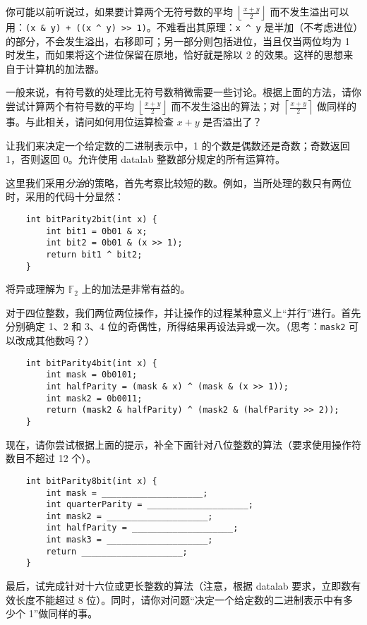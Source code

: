     \begin{example}[模拟操作]
        你可能以前听说过，如果要计算两个无符号数的平均 $\left \lfloor \frac{x+y}{2} \right \rfloor$ 而不发生溢出可以用：\verb|(x & y) + ((x ^ y) >> 1)|。不难看出其原理：\verb|x ^ y| 是半加（不考虑进位）的部分，不会发生溢出，右移即可；另一部分则包括进位，当且仅当两位均为 1 时发生，而如果将这个进位保留在原地，恰好就是除以 2 的效果。这样的思想来自于计算机的加法器。

        一般来说，有符号数的处理比无符号数稍微需要一些讨论。根据上面的方法，请你尝试计算两个有符号数的平均 $\left \lfloor \frac{x+y}{2} \right \rfloor$ 而不发生溢出的算法；对 $\left \lceil \frac{x+y}{2} \right \rceil$ 做同样的事。与此相关，请问如何用位运算检查 $x+y$ 是否溢出了？
    \end{example}

    \begin{example}[计数]
        让我们来决定一个给定数的二进制表示中，1 的个数是偶数还是奇数；奇数返回 1，否则返回 0。允许使用 datalab 整数部分规定的所有运算符。
        
        这里我们采用\emph{分治}的策略，首先考察比较短的数。例如，当所处理的数只有两位时，采用的代码十分显然：
        \begin{verbatim}
    int bitParity2bit(int x) {
        int bit1 = 0b01 & x;
        int bit2 = 0b01 & (x >> 1);
        return bit1 ^ bit2;
    }
        \end{verbatim}
        将异或理解为 $\mathbb F_2$ 上的加法是非常有益的。

        对于四位整数，我们两位两位操作，并让操作的过程某种意义上“并行”进行。首先分别确定 1、2 和 3、4 位的奇偶性，所得结果再设法异或一次。（思考：\texttt{mask2} 可以改成其他数吗？）
        \begin{verbatim}
    int bitParity4bit(int x) {
        int mask = 0b0101;
        int halfParity = (mask & x) ^ (mask & (x >> 1));
        int mask2 = 0b0011;
        return (mask2 & halfParity) ^ (mask2 & (halfParity >> 2));
    }
        \end{verbatim}

        现在，请你尝试根据上面的提示，补全下面针对八位整数的算法（要求使用操作符数目不超过 12 个）。
        \begin{verbatim}
    int bitParity8bit(int x) {
        int mask = ____________________;
        int quarterParity = ____________________;
        int mask2 = ____________________;
        int halfParity = ____________________;
        int mask3 = ____________________;
        return ____________________;
    }
        \end{verbatim}
        最后，试完成针对十六位或更长整数的算法（注意，根据 datalab 要求，立即数有效长度不能超过 8 位）。同时，请你对问题“决定一个给定数的二进制表示中有多少个 1”做同样的事。
    \end{example}

